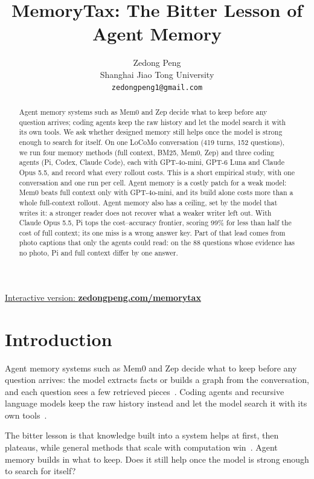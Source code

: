 \documentclass[11pt]{article}
\title{MemoryTax: The Bitter Lesson of Agent Memory}
\author{Zedong Peng\\Shanghai Jiao Tong University\\\texttt{zedongpeng1@gmail.com}}
\date{}
\begin{document}
\maketitle

\begin{center}
\large\href{https://zedongpeng.com/memorytax/}{Interactive version: \textbf{zedongpeng.com/memorytax}}
\end{center}
\vspace{-0.4em}

\begin{abstract}
Agent memory systems such as Mem0 and Zep decide what to keep before any question arrives; coding agents keep the raw history and let the model search it with its own tools. We ask whether designed memory still helps once the model is strong enough to search for itself. On one LoCoMo conversation (419 turns, 152 questions), we run four memory methods (full context, BM25, Mem0, Zep) and three coding agents (Pi, Codex, Claude Code), each with GPT-4o-mini, GPT-6 Luna and Claude Opus 5.5, and record what every rollout costs. This is a short empirical study, with one conversation and one run per cell. Agent memory is a costly patch for a weak model: Mem0 beats full context only with GPT-4o-mini, and its build alone costs more than a whole full-context rollout. Agent memory also has a ceiling, set by the model that writes it: a stronger reader does not recover what a weaker writer left out. With Claude Opus 5.5, Pi tops the cost--accuracy frontier, scoring 99\% for less than half the cost of full context; its one miss is a wrong answer key. Part of that lead comes from photo captions that only the agents could read: on the 88 questions whose evidence has no photo, Pi and full context differ by one answer.
\end{abstract}

\section{Introduction}

Agent memory systems such as Mem0 and Zep decide what to keep before any question arrives: the model extracts facts or builds a graph from the conversation, and each question sees a few retrieved pieces~\citep{chhikara2025mem0,rasmussen2025zep}. Coding agents and recursive language models keep the raw history instead and let the model search it with its own tools~\citep{pi2026,codex2026,claudecode2026,zhang2025rlm}.

The bitter lesson is that knowledge built into a system helps at first, then plateaus, while general methods that scale with computation win~\citep{sutton2019bitter}. Agent memory builds in what to keep. Does it still help once the model is strong enough to search for itself?
\end{document}
